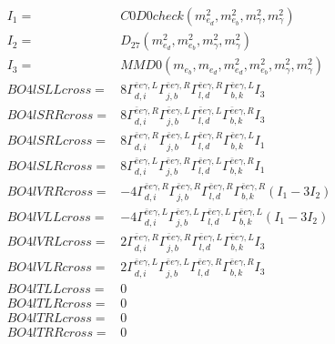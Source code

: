 \documentclass[A4,landscape]{article}
\begin{document}
\begin{align} 
I_1 = & C0D0check(m^2_{e_{{d}}}, m^2_{e_{{b}}}, m^2_{\gamma}, m^2_{\gamma}) \\ 
I_2 = & D_{27}(m^2_{e_{{d}}}, m^2_{e_{{b}}}, m^2_{\gamma}, m^2_{\gamma}) \\ 
I_3 = & MMD0(m_{e_{{b}}}, m_{e_{{d}}}, m^2_{e_{{d}}}, m^2_{e_{{b}}}, m^2_{\gamma}, m^2_{\gamma}) \\ 
  BO4lSLLcross= & 8  \Gamma^{\bar{e}e \gamma ,L}_{d, i} \Gamma^{\bar{e}e \gamma ,R}_{j, b} \Gamma^{\bar{e}e \gamma ,R}_{l, d} \Gamma^{\bar{e}e \gamma ,L}_{b, k} I_3 \\ 
  BO4lSRRcross= & 8  \Gamma^{\bar{e}e \gamma ,R}_{d, i} \Gamma^{\bar{e}e \gamma ,L}_{j, b} \Gamma^{\bar{e}e \gamma ,L}_{l, d} \Gamma^{\bar{e}e \gamma ,R}_{b, k} I_3 \\ 
  BO4lSRLcross= & 8  \Gamma^{\bar{e}e \gamma ,R}_{d, i} \Gamma^{\bar{e}e \gamma ,L}_{j, b} \Gamma^{\bar{e}e \gamma ,R}_{l, d} \Gamma^{\bar{e}e \gamma ,L}_{b, k} I_1 \\ 
  BO4lSLRcross= & 8  \Gamma^{\bar{e}e \gamma ,L}_{d, i} \Gamma^{\bar{e}e \gamma ,R}_{j, b} \Gamma^{\bar{e}e \gamma ,L}_{l, d} \Gamma^{\bar{e}e \gamma ,R}_{b, k} I_1 \\ 
  BO4lVRRcross= & -4  \Gamma^{\bar{e}e \gamma ,R}_{d, i} \Gamma^{\bar{e}e \gamma ,R}_{j, b} \Gamma^{\bar{e}e \gamma ,R}_{l, d} \Gamma^{\bar{e}e \gamma ,R}_{b, k} (I_1 - 3 I_2) \\ 
  BO4lVLLcross= & -4  \Gamma^{\bar{e}e \gamma ,L}_{d, i} \Gamma^{\bar{e}e \gamma ,L}_{j, b} \Gamma^{\bar{e}e \gamma ,L}_{l, d} \Gamma^{\bar{e}e \gamma ,L}_{b, k} (I_1 - 3 I_2) \\ 
  BO4lVRLcross= & 2  \Gamma^{\bar{e}e \gamma ,R}_{d, i} \Gamma^{\bar{e}e \gamma ,R}_{j, b} \Gamma^{\bar{e}e \gamma ,L}_{l, d} \Gamma^{\bar{e}e \gamma ,L}_{b, k} I_3 \\ 
  BO4lVLRcross= & 2  \Gamma^{\bar{e}e \gamma ,L}_{d, i} \Gamma^{\bar{e}e \gamma ,L}_{j, b} \Gamma^{\bar{e}e \gamma ,R}_{l, d} \Gamma^{\bar{e}e \gamma ,R}_{b, k} I_3 \\ 
  BO4lTLLcross= & 0 \\ 
  BO4lTLRcross= & 0 \\ 
  BO4lTRLcross= & 0 \\ 
  BO4lTRRcross= & 0 \\ 
\end{align} 
\end{document}
